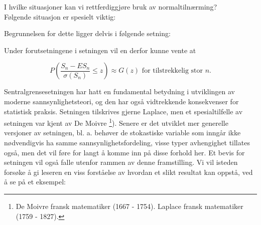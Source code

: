 \noindent I hvilke situasjoner kan vi rettferdiggjøre bruk av
normaltilnærming? \\Følgende situasjon er spesielt viktig:
\begin{center}  \end{center} 
\noindent Begrunnelsen for dette ligger delvis i følgende setning:
\begin{center}  \end{center}
\noindent Under forutsetningene i setningen vil en derfor kunne vente at

   \[ P(\frac{S_n-ES_n}{\sigma (S_n)} \leq z) \approx G(z)  
            \mbox{\ \ for tilstrekkelig stor $n$.}        \]

\noindent Sentralgrensesetningen har hatt en fundamental betydning i
 utviklingen av moderne sannsynlighetsteori, og den har også vidtrekkende
konsekvenser for statistisk praksis. Setningen tilskrives gjerne
Laplace, men et spesialtilfelle av setningen var kjent av De
Moivre \footnote{De Moivre fransk matematiker (1667 - 1754).
Laplace fransk matematiker (1759 - 1827).}). Senere er det
utviklet  mer generelle versjoner av setningen, bl. a. behøver de
stokastiske variable som inngår ikke nødvendigvis ha samme
sannsynlighetsfordeling, visse typer avhengighet tillates også,
men det vil føre for langt å komme inn på disse forhold her. Et
bevis for setningen vil også falle utenfor rammen av denne
framstilling. Vi vil isteden forsøke å gi leseren en viss
forståelse av hvordan et slikt resultat kan oppstå, ved å se på
et eksempel: 


